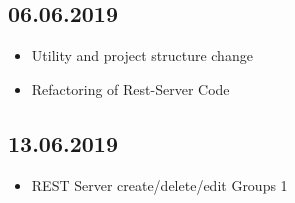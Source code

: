 \documentclass[12pt]{scrartcl}
\begin{document}
    \subsection{06.06.2019}
    \begin{itemize}
        \item Utility and project structure change
        \item Refactoring of Rest-Server Code
    \end{itemize}

    \subsection{13.06.2019}
    \begin{itemize}
        \item REST Server create/delete/edit Groups 1
    \end{itemize}

\end{document}
